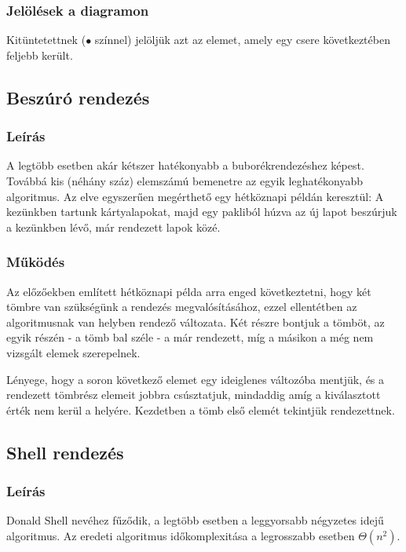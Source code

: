 \documentclass{elteikthesis}
\begin{document}
\subsubsection{Jelölések a diagramon}
Kitüntetettnek (\textcolor{select}{\Huge$\bullet$} színnel) jelöljük azt az elemet, amely egy csere következtében feljebb került.

\subsection{Beszúró rendezés}
\subsubsection{Leírás}
 A legtöbb esetben akár kétszer hatékonyabb a buborékrendezéshez képest\cite{Fekete}. Továbbá kis (néhány száz) elemszámú bemenetre az egyik leghatékonyabb algoritmus. Az elve egyszerűen megérthető egy hétköznapi példán keresztül: A kezünkben tartunk kártyalapokat, majd egy pakliból húzva az új lapot beszúrjuk a kezünkben lévő, már rendezett lapok közé.
\subsubsection{Működés}
Az előzőekben említett hétköznapi példa arra enged következtetni, hogy két tömbre van szükségünk a rendezés megvalósításához, ezzel ellentétben az algoritmusnak van helyben rendező változata. Két részre bontjuk a tömböt, az egyik részén - a tömb bal széle - a már rendezett, míg a másikon a még nem vizsgált elemek szerepelnek.\par
Lényege, hogy a soron következő elemet egy ideiglenes változóba mentjük, és a rendezett tömbrész elemeit jobbra csúsztatjuk, mindaddig amíg a kiválasztott érték nem kerül a helyére. Kezdetben a tömb első elemét tekintjük rendezettnek.

\subsection{Shell rendezés}
\subsubsection{Leírás}
Donald Shell nevéhez fűződik, a legtöbb esetben a leggyorsabb négyzetes idejű algoritmus. Az eredeti algoritmus időkomplexitása a legrosszabb esetben $\Theta(n^2)$.
\end{document}
